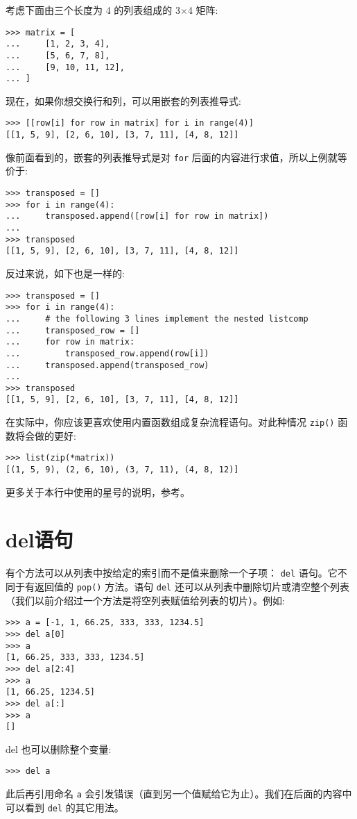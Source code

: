 考虑下面由三个长度为 4 的列表组成的 3$\times$4 矩阵:
\begin{lstlisting}
>>> matrix = [
...     [1, 2, 3, 4],
...     [5, 6, 7, 8],
...     [9, 10, 11, 12],
... ]
\end{lstlisting}
现在，如果你想交换行和列，可以用嵌套的列表推导式:
\begin{lstlisting}
>>> [[row[i] for row in matrix] for i in range(4)]
[[1, 5, 9], [2, 6, 10], [3, 7, 11], [4, 8, 12]]
\end{lstlisting}
像前面看到的，嵌套的列表推导式是对 \texttt{for} 后面的内容进行求值，所以上例就等价于:
\begin{lstlisting}
>>> transposed = []
>>> for i in range(4):
...     transposed.append([row[i] for row in matrix])
...
>>> transposed
[[1, 5, 9], [2, 6, 10], [3, 7, 11], [4, 8, 12]]
\end{lstlisting}
反过来说，如下也是一样的:
\begin{lstlisting}
>>> transposed = []
>>> for i in range(4):
...     # the following 3 lines implement the nested listcomp
...     transposed_row = []
...     for row in matrix:
...         transposed_row.append(row[i])
...     transposed.append(transposed_row)
...
>>> transposed
[[1, 5, 9], [2, 6, 10], [3, 7, 11], [4, 8, 12]]
\end{lstlisting}
在实际中，你应该更喜欢使用内置函数组成复杂流程语句。对此种情况 \texttt{zip()} 函数将会做的更好:
\begin{lstlisting}
>>> list(zip(*matrix))
[(1, 5, 9), (2, 6, 10), (3, 7, 11), (4, 8, 12)]
\end{lstlisting}
更多关于本行中使用的星号的说明，参考。
\section{del语句}
有个方法可以从列表中按给定的索引而不是值来删除一个子项： \texttt{del} 语句。它不同于有返回值的 \texttt{pop()} 方法。语句 \texttt{del} 还可以从列表中删除切片或清空整个列表（我们以前介绍过一个方法是将空列表赋值给列表的切片）。例如:
\begin{lstlisting}
>>> a = [-1, 1, 66.25, 333, 333, 1234.5]
>>> del a[0]
>>> a
[1, 66.25, 333, 333, 1234.5]
>>> del a[2:4]
>>> a
[1, 66.25, 1234.5]
>>> del a[:]
>>> a
[]
\end{lstlisting}
del 也可以删除整个变量:
\begin{lstlisting}
>>> del a
\end{lstlisting}
此后再引用命名 \texttt{a} 会引发错误（直到另一个值赋给它为止）。我们在后面的内容中可以看到 \texttt{del} 的其它用法。
